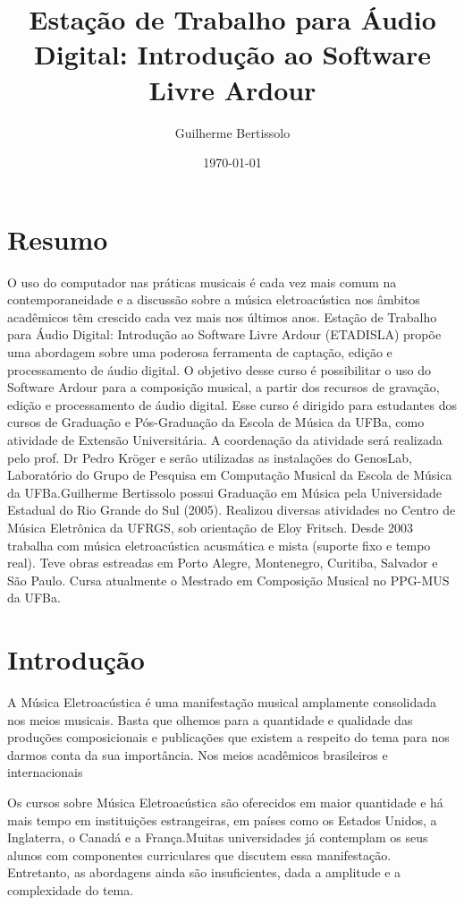 \documentclass{article}
\title{Estação de Trabalho para Áudio Digital: Introdução ao Software Livre Ardour}
\author{Guilherme Bertissolo}
\begin{document}
\date{\today}

\maketitle
\tableofcontents

\section{Resumo}

O uso do computador nas práticas musicais é cada vez mais comum na
contemporaneidade e a discussão sobre a música eletroacústica nos
âmbitos acadêmicos têm crescido cada vez mais nos últimos
anos. Estação de Trabalho para Áudio Digital: Introdução ao Software
Livre Ardour (ETADISLA) propõe uma abordagem sobre uma poderosa
ferramenta de captação, edição e processamento de áudio digital.  O
objetivo desse curso é possibilitar o uso do Software Ardour para a
composição musical, a partir dos recursos de gravação, edição e
processamento de áudio digital.  Esse curso é dirigido para estudantes
dos cursos de Graduação e Pós-Graduação da Escola de Música da UFBa,
como atividade de Extensão Universitária. A coordenação da atividade
será realizada pelo prof. Dr Pedro Kröger e serão utilizadas as
instalações do GenosLab, Laboratório do Grupo de Pesquisa em
Computação Musical da Escola de Música da UFBa.Guilherme Bertissolo
possui Graduação em Música pela Universidade Estadual do Rio Grande do
Sul (2005). Realizou diversas atividades no Centro de Música
Eletrônica da UFRGS, sob orientação de Eloy Fritsch. Desde 2003
trabalha com música eletroacústica acusmática e mista (suporte fixo e
tempo real). Teve obras estreadas em Porto Alegre, Montenegro,
Curitiba, Salvador e São Paulo. Cursa atualmente o Mestrado em
Composição Musical no PPG-MUS da UFBa.

\section{Introdução}

A Música Eletroacústica é uma manifestação musical amplamente
consolidada nos meios musicais. Basta que olhemos para a quantidade e
qualidade das produções composicionais e publicações que existem a
respeito do tema para nos darmos conta da sua importância. Nos meios
acadêmicos brasileiros e internacionais

Os cursos sobre Música Eletroacústica são oferecidos em maior
quantidade e há mais tempo em instituições estrangeiras, em países
como os Estados Unidos, a Inglaterra, o Canadá e a França.Muitas
universidades já contemplam os seus alunos com componentes
curriculares que discutem essa manifestação. Entretanto, as abordagens
ainda são insuficientes, dada a amplitude e a complexidade do tema.
\end{document}
